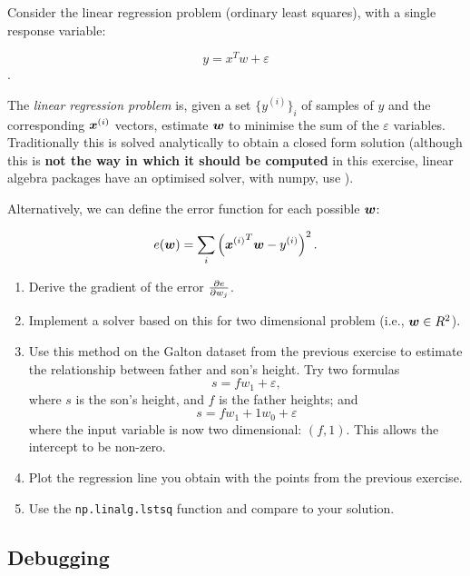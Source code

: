 \begin{exercise}
Consider the linear regression problem (ordinary least squares), with a single response variable:

\[
y = x^T w + \varepsilon
\].

The \emph{linear regression problem} is, given a set $\{ y^{(i)} \}_i$ of
samples of $y$ and the corresponding $\bm{x}^{(i)}$ vectors, estimate
$\bm{w}$ to minimise the sum of the $\varepsilon$ variables. Traditionally
this is solved analytically to obtain a closed form solution (although this is
\textbf{not the way in which it should be computed} in this exercise, linear algebra packages
have an optimised solver, with numpy, use ).

Alternatively, we can define the error function for each possible $\bm{w}$:

\[
e(\bm{w}) = \sum_i \left( {\bm{x}^{(i)}}^T \bm{w} - y^{(i)} \right)^2.
\]

\begin{enumerate}
\item Derive the gradient of the error $\frac{\partial e}{\partial w_j}$.
\item Implement a solver based on this for two dimensional problem (i.e.,
$\bm{w} \in R^2$). 
\item Use this method on the Galton dataset from the previous exercise to
estimate the relationship between father and son's height. Try two formulas
\begin{equation}
s = f w_1 + \varepsilon,
\label{}
\end{equation}
where $s$ is the son's height, and $f$ is the father heights; and
\begin{equation}
s = f w_1 + 1w_0 + \varepsilon
\label{}
\end{equation}
where the input variable is now two dimensional: $(f,1)$. This allows the
intercept to be non-zero.
\item Plot the regression line you obtain with the points from the previous
exercise.
\item Use the \texttt{np.linalg.lstsq} function and compare to your solution.
\end{enumerate}
\end{exercise}

\subsection{Debugging}


